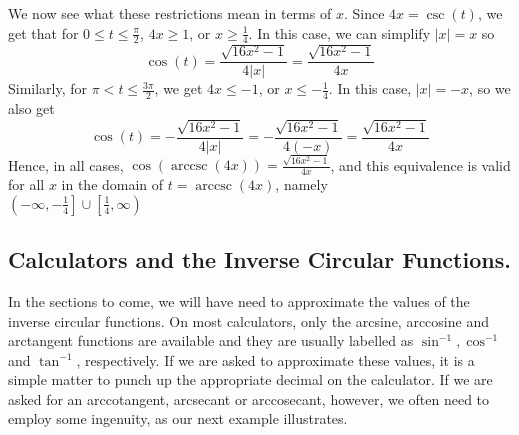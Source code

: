 {\begin{enumerate}
\begin{enumerate}
We now see what these restrictions mean in terms of $x$.  Since $4x = \csc(t)$, we get that for $0 \leq t \leq \frac{\pi}{2}$, $4x \geq 1$, or $x \geq \frac{1}{4}$.  In this case, we can simplify $|x| = x$ so 
\[
\cos(t) = \frac{\sqrt{16x^2-1}}{4|x|} = \frac{\sqrt{16x^2-1}}{4x}
\]  
Similarly, for $\pi < t \leq \frac{3\pi}{2}$, we get $4x \leq -1$, or $x \leq -\frac{1}{4}$.  In this case, $|x| = -x$, so we also get 
\[
\cos(t) = -\frac{\sqrt{16x^2-1}}{4|x|}  = -\frac{\sqrt{16x^2-1}}{4(-x)} =  \frac{\sqrt{16x^2-1}}{4x}
\]  
Hence, in all cases, $\cos(\operatorname{arccsc}(4x)) =  \frac{\sqrt{16x^2-1}}{4x}$, and this equivalence is valid for all $x$ in the domain of $t = \operatorname{arccsc}(4x)$, namely \\$\left(-\infty, -\frac{1}{4}\right] \cup \left[ \frac{1}{4}, \infty \right)$  

\end{enumerate}

\end{enumerate}
}



\medskip

\subsection{Calculators and the Inverse Circular Functions.}
\label{sectionarcstuffoncalc}

In the sections to come, we will have need to approximate the values of the inverse circular functions.  On most calculators, only the arcsine, arccosine and arctangent functions are available and they are usually labelled as $\sin^{-1}, \cos^{-1}$ and $\tan^{-1}$, respectively.  If we are asked to approximate these values, it is a simple matter to punch up the appropriate decimal on the calculator.  If we are asked for an arccotangent, arcsecant or arccosecant, however, we often need to employ some ingenuity, as our next example illustrates.

\medskip


